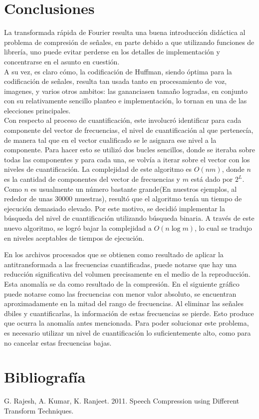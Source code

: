 \documentclass[a4paper,11pt]{article}
\begin{document}
\section{Conclusiones}
La transformada rápida de Fourier resulta una buena introducción didáctica al
problema de compresión de señales, en parte debido a que utilizando funciones
de librería, uno puede evitar perderse en los detalles de implementación y
concentrarse en el asunto en cuestión. \\
A su vez, es claro cómo, la codificación de Huffman, siendo óptima para la
codificación de señales, resulta tan usada tanto en procesamiento de voz,
imagenes, y varios otros ambitos: las gananciasen tamaño logradas, en conjunto
con su relativamente sencillo planteo e implementación, lo tornan en una de las
elecciones principales. \\

Con respecto al proceso de cuantificación, este involucró identificar para
cada componente del vector de frecuencias, el nivel de cuantificación al que
pertenecía, de manera tal que en el vector cualificado se le asignara ese nivel
a la componente. Para hacer esto se utilizó dos bucles sencillos, donde se
iteraba sobre todas las componentes y para cada una, se volvía a iterar sobre
el vector con los niveles de cuantificación. La complejidad de este algoritmo
es $O(nm)$, donde $n$ es la cantidad de componentes del vector de frecuencias y
$m$ está dado por $2^{L}$. Como $n$ es usualmente un número bastante grande(En
nuestros ejemplos, al rededor de unas 30000 muestras), resultó que el algoritmo
tenía un tiempo de ejecución demasiado elevado. Por este motivo, se decidió
implementar la búsqueda del nivel de cuantificación utilizando búsqueda
binaria. A través de este nuevo algoritmo, se logró bajar la complejidad a
$O(n\log m)$, lo cual se tradujo en niveles aceptables de tiempos de ejecución.

En los archivos procesados que se obtienen como resultado de aplicar la
antitransformada a las frecuencias cuantificadas, puede notarse que hay una
reducción significativa del volumen precisamente en el medio de la
reproducción. Esta anomalía se da como resultado de la compresión. En el
siguiente gráfico puede notarse como las frecuencias con menor valor absoluto,
se encuentran aproximadamente en la mitad del rango de frecuencias.
Al eliminar las señales dbiles y cuantificarlas, la información de estas
frecuencias se pierde. Esto produce que ocurra la anomalía antes mencionada.
Para poder solucionar este problema, es necesario utilizar un nivel de
cuantificación lo suficientemente alto, como para no cancelar estas frecuencias
bajas.
\section{Bibliograf\'ia}
G. Rajesh, A. Kumar, K. Ranjeet. 2011. Speech Compression using Different Transform Techniques.
\end{document}
